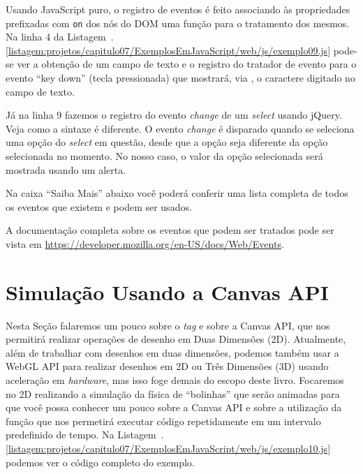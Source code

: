 Usando JavaScript puro, o registro de eventos é feito associando às propriedades prefixadas com \texttt{on} dos nós do DOM uma função para o tratamento dos mesmos. Na linha 4 da Listagem~\thechapter.\ref{listagem:projetos/capitulo07/ExemplosEmJavaScript/web/js/exemplo09.js} pode-se ver a obtenção de um campo de texto e o registro do tratador de evento para o evento ``key down'' (tecla pressionada) que mostrará, via , o caractere digitado no campo de texto.

Já na linha 9 fazemos o registro do evento \textit{change} de um \textit{select} usando jQuery. Veja como a sintaxe é diferente. O evento \textit{change} é disparado quando se seleciona uma opção do \textit{select} em questão, desde que a opção seja diferente da opção selecionada no momento. No nosso caso, o valor da opção selecionada será mostrada usando um alerta.

Na caixa ``Saiba Mais'' abaixo você poderá conferir uma lista completa de todos os eventos que existem e podem ser usados.

\begin{saibaMais}
    A documentação completa sobre os eventos que podem ser tratados pode ser vista em  \url{https://developer.mozilla.org/en-US/docs/Web/Events}.
\end{saibaMais}



\section{Simulação Usando a Canvas API}

Nesta Seção falaremos um pouco sobre o \textit{tag}  e sobre a Canvas API, que nos permitirá realizar operações de desenho em Duas Dimensões (2D). Atualmente, além de trabalhar com desenhos em duas dimensões, podemos também usar a WebGL API para realizar desenhos em 2D ou Três Dimensões (3D) usando aceleração em \textit{hardware}, mas isso foge demais do escopo deste livro. Focaremos no 2D realizando a simulação da física de ``bolinhas'' que serão animadas para que você possa conhecer um pouco sobre a Canvas API e sobre a utilização da função  que nos permetirá executar código repetidamente em um intervalo predefinido de tempo. Na Listagem~\thechapter.\ref{listagem:projetos/capitulo07/ExemplosEmJavaScript/web/js/exemplo10.js} podemos ver o código completo do exemplo.


